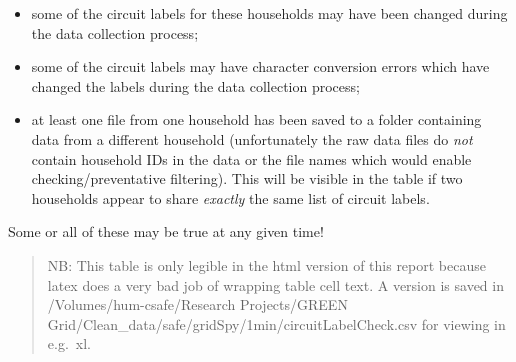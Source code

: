 \documentclass[]{article}
\providecommand{\tightlist}{%
  \setlength{\itemsep}{0pt}\setlength{\parskip}{0pt}}
\begin{document}
\begin{itemize}
\tightlist
\item
  some of the circuit labels for these households may have been changed
  during the data collection process;
\item
  some of the circuit labels may have character conversion errors which
  have changed the labels during the data collection process;
\item
  at least one file from one household has been saved to a folder
  containing data from a different household (unfortunately the raw data
  files do \emph{not} contain household IDs in the data or the file
  names which would enable checking/preventative filtering). This will
  be visible in the table if two households appear to share
  \emph{exactly} the same list of circuit labels.
\end{itemize}

Some or all of these may be true at any given time!

\begin{quote}
NB: This table is only legible in the html version of this report
because latex does a very bad job of wrapping table cell text. A version
is saved in /Volumes/hum-csafe/Research Projects/GREEN
Grid/Clean\_data/safe/gridSpy/1min/circuitLabelCheck.csv for viewing in
e.g.~xl.
\end{quote}
\end{document}
